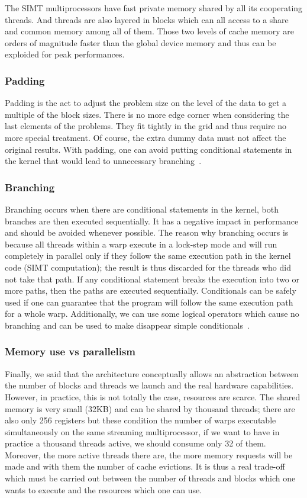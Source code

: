 The SIMT multiprocessors have fast private memory shared by all its cooperating threads. And threads are also layered in blocks which can all access to a share and common memory among all of them. Those two levels of cache memory are orders of magnitude faster than the global device memory and thus can be exploided for peak performances.

\subsubsection{Padding}

Padding is the act to adjust the problem size on the level of the data to get a multiple of the block sizes. There is no more edge corner when considering the last elements of the problems. They fit tightly in the grid and thus require no more special treatment. Of course, the extra dummy data must not affect the original results. With padding, one can avoid putting conditional
statements in the kernel that would lead to unnecessary branching~\cite{navarro2014survey}.

\subsubsection{Branching}

Branching occurs when there are conditional statements in the kernel, both branches are then executed sequentially. It has a negative impact in performance and should be avoided whenever possible. The reason why branching occurs is because all threads within a warp execute in a lock-step mode and will run completely in parallel only if they follow the same execution path in the kernel code (SIMT computation); the result is thus discarded for the threads who did not take that path. If any conditional statement breaks the execution into two or more paths, then the paths are executed sequentially. Conditionals can be safely used if one can guarantee that the program will follow the same execution path for a whole warp. Additionally, we can use some logical operators which cause no branching and can be used to make disappear simple conditionals~\cite{harris2007parallel}.

\subsubsection{Memory use vs parallelism}

Finally, we said that the architecture conceptually allows an abstraction between the number of blocks and threads we launch and the real hardware capabilities. However, in practice, this is not totally the case, resources are scarce. The shared memory is very small (32KB) and can be shared by thousand threads; there are also only 256 registers but these condition the number of warps executable simultaneously on the same streaming multiprocessor, if we want to have in practice a thousand threads active, we should consume only 32 of them. Moreover, the more active threads there are, the more memory requests will be made and with them the number of cache evictions. It is thus a real trade-off which must be carried out between the number of threads and blocks which one wants to execute and the resources which one can use.
